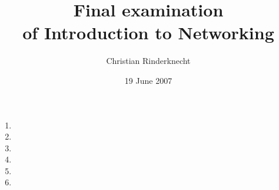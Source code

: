 \documentclass[10pt,a4paper]{article}
\title{Final examination\\ of Introduction to Networking}
\author{Christian Rinderknecht}
\date{19 June 2007}
\begin{document}
\maketitle

\thispagestyle{empty}

\begin{enumerate}

  \item
    

  \item
    

  \item
    

  \item
    

  \item
    

  \item
    

\end{enumerate}
\end{document}
